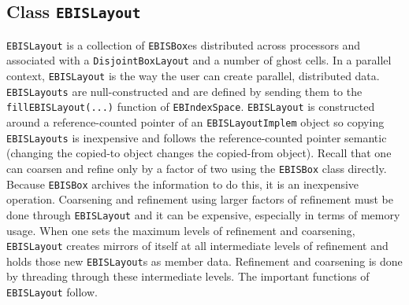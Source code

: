 \subsection{Class {\tt EBISLayout}}
\label{sec::ebislayout}

{\tt EBISLayout} is a collection of {\tt EBISBox}es distributed
across processors and associated with a {\tt DisjointBoxLayout}
and a number of ghost cells.  In a parallel context,  {\tt EBISLayout}
is the way the user can create parallel, distributed data.  
{\tt EBISLayouts} are null-constructed and are defined 
by sending them to the {\tt fillEBISLayout(...)}
function of {\tt EBIndexSpace}.  {\tt EBISLayout} is constructed around a 
reference-counted pointer of an {\tt EBISLayoutImplem}
object so copying {\tt EBISLayouts} is inexpensive and
follows the reference-counted pointer semantic (changing
the copied-to object changes the copied-from object).
Recall that one can coarsen and refine only by a factor of two
using the {\tt EBISBox} class directly.  Because {\tt EBISBox}
archives the information to do this, it is an inexpensive operation.
Coarsening and refinement using larger factors of refinement
must be done through {\tt EBISLayout} and it can be expensive,
especially in terms of memory usage.
When one sets the maximum levels of refinement and coarsening,
{\tt EBISLayout} creates mirrors of itself at all intermediate
levels of refinement and holds those new {\tt EBISLayout}s as
member data.  Refinement and coarsening is done by threading
through these intermediate levels.
The important functions of {\tt EBISLayout} follow.  

